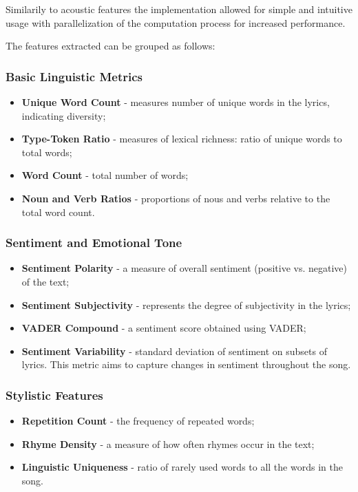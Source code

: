 Similarily to acoustic features the implementation allowed for simple and
intuitive usage  with parallelization of the computation process for increased
performance. 

The features extracted can be grouped as follows:

\subsubsection*{Basic Linguistic Metrics}
\begin{itemize}
  \item \textbf{Unique Word Count} - measures number of unique words in the
    lyrics, indicating diversity;
  \item \textbf{Type-Token Ratio} - measures of lexical richness: ratio of
    unique words to total words;
  \item \textbf{Word Count} - total  number of words;
  \item \textbf{Noun and Verb Ratios} - proportions of nous and verbs relative
    to the total word count.
\end{itemize}


\subsubsection*{Sentiment and Emotional Tone}
\begin{itemize}
  \item \textbf{Sentiment Polarity} - a measure of overall sentiment (positive
    vs. negative) of the text;
  \item \textbf{Sentiment Subjectivity} - represents the degree of subjectivity
    in the lyrics;
  \item \textbf{VADER Compound} - a sentiment score obtained using VADER;
  \item \textbf{Sentiment Variability} - standard deviation of sentiment on
    subsets of lyrics. This metric aims to capture changes in sentiment
    throughout the song.
\end{itemize}


\subsubsection*{Stylistic Features}
\begin{itemize}
  \item \textbf{Repetition Count} - the frequency of repeated words;
  \item \textbf{Rhyme Density} - a measure of how often rhymes occur in the
    text;
  \item \textbf{Linguistic Uniqueness} - ratio of rarely used words to all the
    words in the song.
\end{itemize}


